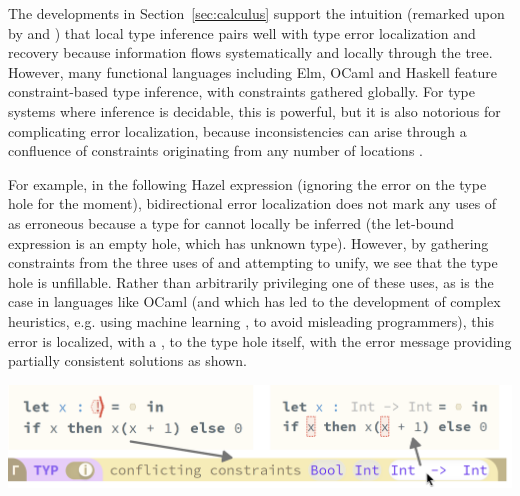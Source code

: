 % 

The developments in Section~\ref{sec:calculus} support the intuition (remarked upon by \citet{Localinf} and \citet{BidirTyping}) that local type inference pairs well with type error localization and recovery because information flows systematically and locally through the tree. However, many functional languages including Elm, OCaml and Haskell feature constraint-based type inference, with constraints gathered globally. For type systems where inference is decidable, this is powerful, but it is also notorious for complicating error localization, because inconsistencies can arise through a confluence of constraints originating from any number of locations \cite{DBLP:conf/popl/Wand86}. 

For example, in the following Hazel expression (ignoring the error on the type hole for the moment), bidirectional error localization 
does not mark any uses of  as erroneous because a type for  cannot locally be inferred (the let-bound expression is an empty hole, which has unknown type). However, by gathering constraints from the three uses of  and attempting to unify, we see that the type hole is unfillable. Rather than arbitrarily privileging one of these uses, as is the case in languages like OCaml (and which has led to the development of complex heuristics, e.g. using machine learning \cite{SeidelBlame}, to avoid misleading programmers), this error is localized, with a \li{!}, to the type hole itself, with the error message providing partially consistent solutions as shown.
\\
\begin{center}
    \includegraphics[scale=0.4]{images/figSugg.png}
\end{center}


